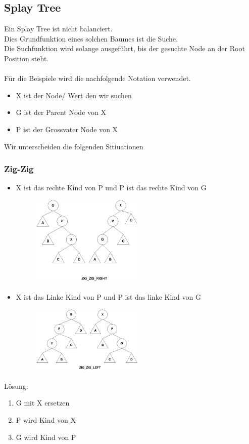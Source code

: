 \documentclass[a4paper,10pt]{report}
\begin{document}
\subsection{Splay Tree}
Ein Splay Tree ist nicht balanciert.\\
Dies Grundfunktion eines solchen Baumes ist die Suche.\\
Die Suchfunktion wird solange ausgeführt, bis der gesuchte Node an der Root Position steht.\\
\\
Für die Beispiele wird die nachfolgende Notation verwendet.
\begin{itemize}
	\item
		X ist der Node/ Wert den wir suchen
	\item
		G ist der Parent Node von X
	\item
		P ist der Grossvater Node von X
\end{itemize}
Wir unterscheiden die folgenden Sitiuationen
\newpage
\subsubsection{Zig-Zig}
\begin{itemize}
	\item
		X ist das rechte Kind von P und P ist das rechte Kind von G
		\begin{figure}[h]
			\begin{center}
  			\includegraphics[width=0.5\textwidth]{img/zzright.jpg}
		\end{center}
	\end{figure}
	\item	
		X ist das Linke Kind von P und P ist das linke Kind von G
		\begin{figure}[h]
			\begin{center}
  				\includegraphics[width=0.5\textwidth]{img/zzleft.jpg}
			\end{center}
		\end{figure}
\end{itemize}
Lösung:
\begin{enumerate}
	\item
		G mit X ersetzen
	\item
		P wird Kind von X
	\item
		G wird Kind von P
\end{enumerate}
\newpage
\end{document}

